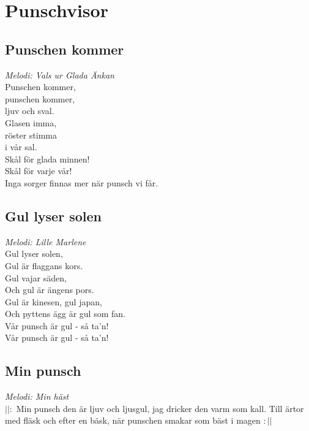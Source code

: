 \chapter{Punschvisor}
\section{Punschen kommer}
\textit{Melodi: Vals ur Glada Änkan}
\vspace{2mm}\\
Punschen kommer,\\
punschen kommer,\\
ljuv och sval.\\
Glasen imma,\\
röster stimma\\
i vår sal.\\
Skål för glada minnen!\\
Skål för varje vår!\\
Inga sorger finnas mer
när punsch vi får.\\

\section{Gul lyser solen}
\textit{Melodi: Lille Marlene }
\vspace{2mm}\\
Gul lyser solen,\\
Gul är flaggans kors.\\
Gul vajar säden,\\
Och gul är ängens pors.\\
Gul är kinesen, gul japan,\\
Och pyttens ägg är gul som fan.\\
Vår punsch är gul - så ta'n!\\
Vår punsch är gul - så ta'n!\\

\section{Min punsch}
\textit{Melodi: Min häst}
\vspace{2mm}\\
$||:$ Min punsch den är ljuv och ljusgul,
jag dricker den varm som kall.
Till ärtor med fläsk
och efter en bäsk,
när punschen smakar som bäst i magen $:||$

